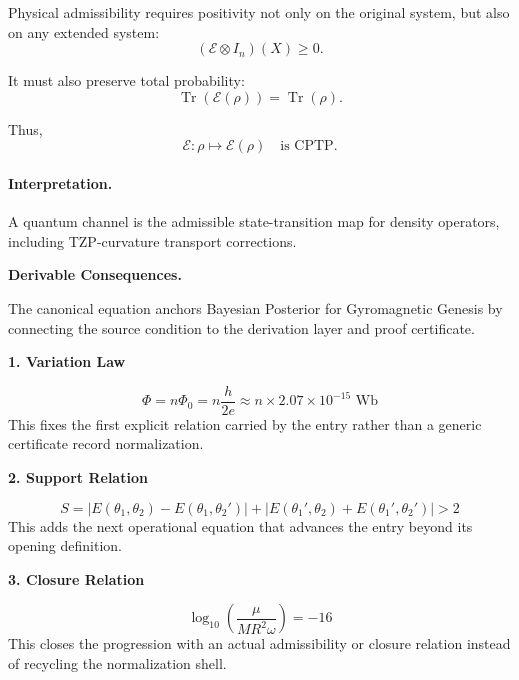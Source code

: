 Physical admissibility requires positivity not only on the original system, but also on any extended system:
\begin{equation}
(\mathcal{E}\otimes I_n)(X)\geq 0 .
\end{equation}

It must also preserve total probability:
\begin{equation}
\operatorname{Tr}(\mathcal{E}(\rho))=\operatorname{Tr}(\rho).
\end{equation}

Thus,
\begin{equation}
\boxed{
\mathcal{E}:\rho\mapsto\mathcal{E}(\rho)
\quad
\text{is CPTP}.
}
\end{equation}

\paragraph{Interpretation.}
A quantum channel is the admissible state-transition map for density operators, including TZP-curvature transport corrections.

\par\vspace{0.35em}
\noindent\textbf{Derivable Consequences.}\quad
\begingroup
\footnotesize
\raggedright
The canonical equation anchors Bayesian Posterior for Gyromagnetic Genesis by connecting the source condition to the derivation layer and proof certificate.
\par\endgroup

\noindent\textbf{1. Variation Law}\par
\[
\Phi = n\Phi_0 = n\frac{h}{2e} \approx n \times 2.07 \times 10^{-15} \text{ Wb}
\]
\noindent This fixes the first explicit relation carried by the entry rather than a generic certificate record normalization.\par
\noindent\textbf{2. Support Relation}\par
\[
S = |E(\theta_1, \theta_2) - E(\theta_1, \theta_2')| + |E(\theta_1', \theta_2) + E(\theta_1', \theta_2')| > 2
\]
\noindent This adds the next operational equation that advances the entry beyond its opening definition.\par
\noindent\textbf{3. Closure Relation}\par
\[
\log_{10}\!\left(\frac{\mu}{MR^2\omega}\right)=-16
\]
\noindent This closes the progression with an actual admissibility or closure relation instead of recycling the normalization shell.\par

